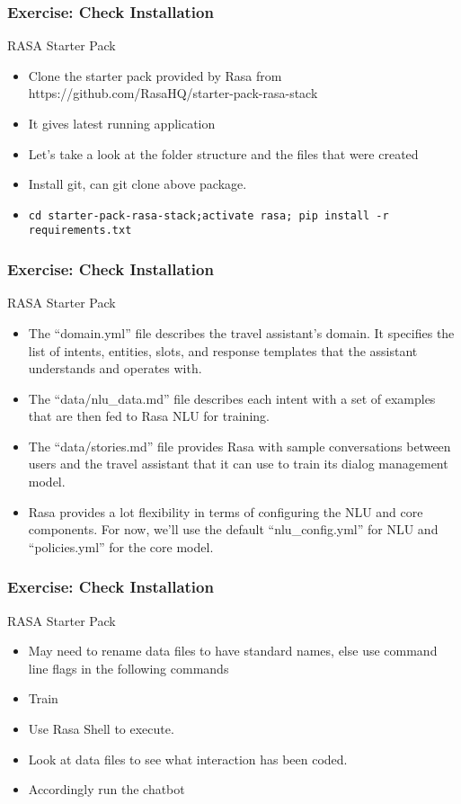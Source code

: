 \begin{frame}[fragile]\frametitle{Exercise: Check Installation}
RASA Starter Pack
\begin{itemize}
\item Clone the starter pack provided by Rasa from https://github.com/RasaHQ/starter-pack-rasa-stack
\item It gives latest running application
\item Let's take a look at the folder structure and the files that were created 
\item Install git, can git clone above package.
\item \lstinline|cd starter-pack-rasa-stack;activate rasa; pip install -r requirements.txt|

\end{itemize}
\end{frame}

 \begin{frame}[fragile]\frametitle{Exercise: Check Installation}
RASA Starter Pack
\begin{itemize}
\item The ``domain.yml'' file describes the travel assistant's domain. It specifies the list of intents, entities, slots, and response templates that the assistant understands and operates with.
\item The ``data/nlu\_data.md'' file describes each intent with a set of examples that are then fed to Rasa NLU for training.
\item The ``data/stories.md'' file provides Rasa with sample conversations between users and the travel assistant that it can use to train its dialog management model.
\item Rasa provides a lot flexibility in terms of configuring the NLU and core components. For now, we'll use the default ``nlu\_config.yml'' for NLU and ``policies.yml'' for the core model.
\end{itemize}


\end{frame}

 \begin{frame}[fragile]\frametitle{Exercise: Check Installation}
RASA Starter Pack
\begin{itemize}
\item May need to rename data files to have standard names, else use command line flags in the following commands
\item Train
\item Use Rasa Shell to execute.
\item Look at data files to see what interaction has been coded.
\item Accordingly run the chatbot
\end{itemize}


\end{frame}



